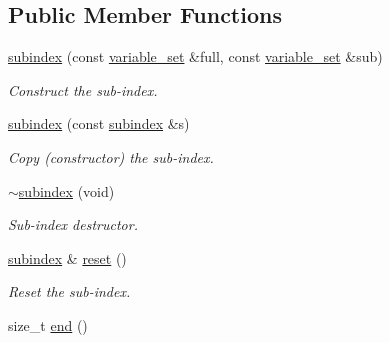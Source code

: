 \subsection*{Public Member Functions}
\begin{DoxyCompactItemize}
\item 
\hyperlink{classmerlin_1_1subindex_a4dc11ac00d5b35a1a576c079b61ba482}{subindex} (const \hyperlink{classmerlin_1_1variable__set}{variable\+\_\+set} \&full, const \hyperlink{classmerlin_1_1variable__set}{variable\+\_\+set} \&sub)\hypertarget{classmerlin_1_1subindex_a4dc11ac00d5b35a1a576c079b61ba482}{}\label{classmerlin_1_1subindex_a4dc11ac00d5b35a1a576c079b61ba482}

\begin{DoxyCompactList}\small\item\em Construct the sub-\/index. \end{DoxyCompactList}\item 
\hyperlink{classmerlin_1_1subindex_a3e0464e36f33fb7ceb0a797ff5296d32}{subindex} (const \hyperlink{classmerlin_1_1subindex}{subindex} \&s)\hypertarget{classmerlin_1_1subindex_a3e0464e36f33fb7ceb0a797ff5296d32}{}\label{classmerlin_1_1subindex_a3e0464e36f33fb7ceb0a797ff5296d32}

\begin{DoxyCompactList}\small\item\em Copy (constructor) the sub-\/index. \end{DoxyCompactList}\item 
\hyperlink{classmerlin_1_1subindex_a2d5988647a46e6373084f968f1a623bc}{$\sim$subindex} (void)\hypertarget{classmerlin_1_1subindex_a2d5988647a46e6373084f968f1a623bc}{}\label{classmerlin_1_1subindex_a2d5988647a46e6373084f968f1a623bc}

\begin{DoxyCompactList}\small\item\em Sub-\/index destructor. \end{DoxyCompactList}\item 
\hyperlink{classmerlin_1_1subindex}{subindex} \& \hyperlink{classmerlin_1_1subindex_a0acd5e4bf8b9ed42b76c1c67ea9ad13e}{reset} ()\hypertarget{classmerlin_1_1subindex_a0acd5e4bf8b9ed42b76c1c67ea9ad13e}{}\label{classmerlin_1_1subindex_a0acd5e4bf8b9ed42b76c1c67ea9ad13e}

\begin{DoxyCompactList}\small\item\em Reset the sub-\/index. \end{DoxyCompactList}\item 
size\+\_\+t \hyperlink{classmerlin_1_1subindex_a013078eb23f9c472347866c67951ce15}{end} ()\hypertarget{classmerlin_1_1subindex_a013078eb23f9c472347866c67951ce15}{}\label{classmerlin_1_1subindex_a013078eb23f9c472347866c67951ce15}


\end{DoxyCompactItemize}
